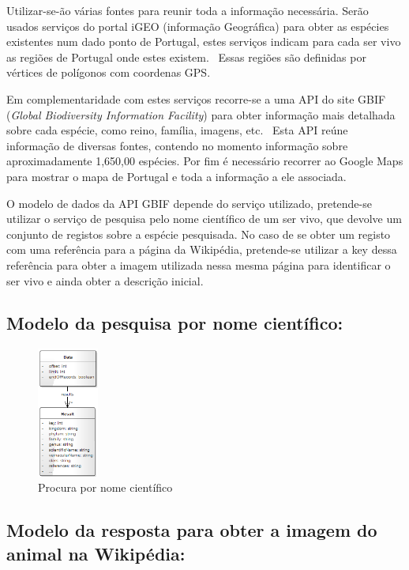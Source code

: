 \documentclass[twocolumn,twoside,11pt,a4paper]{article}
\begin{document}
Utilizar-se-ão várias fontes para reunir toda a informação necessária. Serão usados serviços do portal iGEO (informação Geográfica) para obter as espécies existentes num dado ponto de Portugal, estes serviços indicam para cada ser vivo as regiões de Portugal onde estes existem.~\cite{igeo} Essas regiões são definidas por vértices de polígonos com coordenas GPS. 

Em complementaridade com estes serviços recorre-se a uma API do site GBIF (\emph{Global Biodiversity Information Facility}) para obter informação mais detalhada sobre cada espécie, como reino, família, imagens, etc.~\cite{gbif} Esta API reúne informação de diversas fontes, contendo no momento informação sobre aproximadamente 1,650,00 espécies. Por fim é necessário recorrer ao Google Maps para mostrar o mapa de Portugal e toda a informação a ele associada.~\cite{googlemaps}

O modelo de dados da API GBIF depende do serviço utilizado, pretende-se utilizar o serviço de pesquisa pelo nome científico de um ser vivo, que devolve um conjunto de registos sobre a espécie pesquisada. No caso de se obter um registo com uma referência para a página da Wikipédia, pretende-se utilizar a key dessa referência para obter a imagem utilizada nessa mesma página para identificar o ser vivo e ainda obter a descrição inicial. 

\subsection{Modelo da pesquisa por nome científico:}

\begin{figure}[ht!]
	\begin{center}
		\leavevmode
		\includegraphics[width=0.18\textwidth,height=0.24\textheight]{Search_by_Scientify_Name}
		\caption{Procura por nome científico}
		\label{fig:arch}
	\end{center}
\end{figure}

\subsection{Modelo da resposta  para obter a imagem do animal na Wikipédia:}
\end{document}
